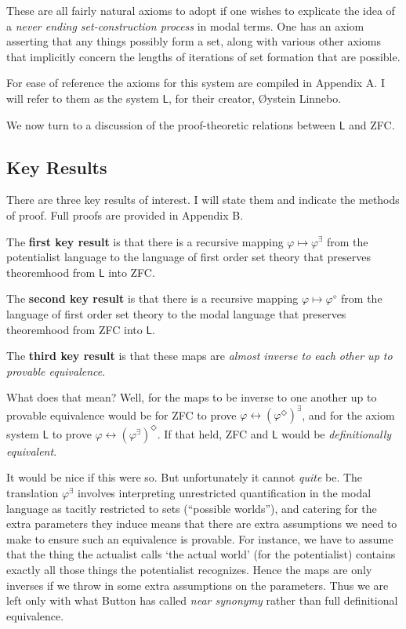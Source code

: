 \documentclass{article}
\begin{document}
These are all fairly natural axioms to adopt if one wishes to explicate the idea 
of a \emph{never ending set-construction process} in modal terms. One has an axiom 
asserting that any things possibly form a set, along with various other axioms 
that implicitly concern the lengths of iterations of set formation that are possible.

For ease of reference the axioms 
for this system are compiled in Appendix A. I will refer to them as the system $\mathsf{L}$,
for their creator, \O ystein Linnebo.

We now turn to a discussion of the proof-theoretic relations between $\mathsf{L}$
and ZFC. 
\subsection{Key Results}
There are three key results of interest. I will state them and indicate the methods of proof. 
Full proofs are provided in Appendix B. 

The {\bf first key result} is that there is a recursive mapping 
$\varphi \mapsto \varphi^\exists$ from the potentialist 
language to the language of first order set theory that preserves theoremhood 
from $\mathsf{L}$ into ZFC.

The {\bf second key result} is that there is a recursive mapping 
$\varphi \mapsto \varphi^\diamond$ from the language of first 
order set theory to the modal language that preserves theoremhood 
from ZFC into $\mathsf{L}$.

The {\bf third key result} is that these maps are 
\emph{almost inverse to each other up to provable equivalence}. 

What does that mean? 
Well, for the maps to be inverse to one another up to provable equivalence would be for 
ZFC to prove $\varphi \leftrightarrow (\varphi^\Diamond)^\exists$, and for the axiom system $\mathsf{L}$ 
to prove
$\varphi \leftrightarrow (\varphi^\exists)^\Diamond$. If that held, 
ZFC and $\mathsf{L}$ would be 
\emph{definitionally equivalent}. 

It would be nice if this were so. But unfortunately it cannot \emph{quite} be. 
The translation $\varphi^\exists$ 
involves interpreting unrestricted quantification in the modal language as tacitly restricted 
to sets (``possible worlds''), and catering for the extra parameters they induce means that there
are extra assumptions we need to make to ensure such an equivalence is provable. For 
instance, we have to assume that the thing the actualist calls `the actual world' (for the potentialist)
contains exactly all those things the potentialist recognizes. Hence the maps 
are only inverses if we throw in some extra assumptions on the parameters.  Thus we are 
left only with what Button has called \emph{near synonymy} rather than full definitional 
equivalence.
\end{document}
